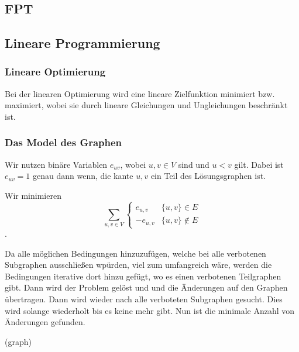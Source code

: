 \documentclass[12pt,a4paper,onecolumn,oneside,titlepage]{article}
\let\oldReturn\Return
\renewcommand{\Return}{\State\oldReturn}
\begin{document}
\subsection{FPT}
\subsection{Lineare Programmierung}
\subsubsection{Lineare Optimierung}
Bei der linearen Optimierung wird eine lineare Zielfunktion minimiert bzw. maximiert, wobei sie durch lineare Gleichungen und Ungleichungen beschränkt ist.
\subsubsection{Das Model des Graphen}
Wir nutzen binäre Variablen $e_{uv}$, wobei $u,v \in V$ sind und $u < v$ gilt.
Dabei ist $e_{uv} = 1$ genau dann wenn, die kante ${u,v}$ ein Teil des Lösungsgraphen ist.

Wir minimieren \[\sum_{u,v \in V} 
\begin{cases} 
      e_{u,v} & \{u,v\} \in E \\
      -e_{u,v} & \{u,v\} \notin E
   \end{cases}\].
   
Da alle möglichen Bedingungen hinzuzufügen, welche bei alle verbotenen Subgraphen ausschließen wpürden, viel zum umfangreich wäre, werden die Bedingungen iterative dort hinzu gefügt, wo es einen verbotenen Teilgraphen gibt. Dann wird der Problem gelöst und und die Änderungen auf den Graphen übertragen. Dann wird wieder nach alle verboteten Subgraphen gesucht. Dies wird solange wiederholt bis es keine mehr gibt. Nun ist die minimale Anzahl von Änderungen gefunden. 
\pagebreak

\begin{center}
  \label{euclid}
\begin{algorithmic}[1]
				\Else 
				\EndIf
			\EndFor
		\EndFor
	\EndWhile
\EndFor
\Return(graph)
\EndFunction
\end{algorithmic}
\end{center}
\end{document}
